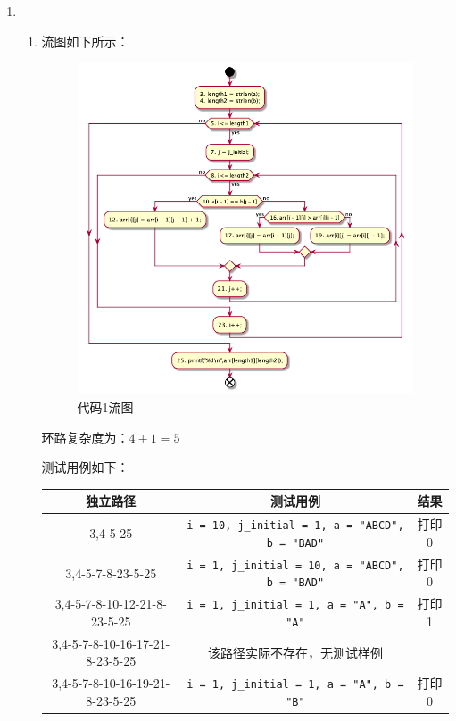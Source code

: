 \documentclass{article}
\begin{document}
\begin{enumerate}[label=\arabic*.]
        \item \ \begin{enumerate}[label=代码\arabic*]
            \item 流图如下所示：\\
            \begin{figure}[H]
                \centering
                \includegraphics[scale=0.5]{fig/hw01/flow_diagram1.png}
                \caption{代码1流图}
            \end{figure}

            环路复杂度为：$4 + 1 = 5$

            测试用例如下：\\
            \begin{tabular}{|c|c|c|}
                \hline
                独立路径 & 测试用例 & 结果 \\
                \hline
                3,4-5-25 & \verb|i = 10, j_initial = 1, a = "ABCD", b = "BAD"| & 打印0 \\
                \hline
                3,4-5-7-8-23-5-25 & \verb|i = 1, j_initial = 10, a = "ABCD", b = "BAD"|  & 打印0 \\
                \hline
                3,4-5-7-8-10-12-21-8-23-5-25 & \verb|i = 1, j_initial = 1, a = "A", b = "A"| & 打印1 \\
                \hline
                3,4-5-7-8-10-16-17-21-8-23-5-25 & 该路径实际不存在，无测试样例 & ~ \\
                \hline
                3,4-5-7-8-10-16-19-21-8-23-5-25 & \verb|i = 1, j_initial = 1, a = "A", b = "B"| & 打印0 \\
                \hline
            \end{tabular}


\end{enumerate}
\end{enumerate}
\end{document}

